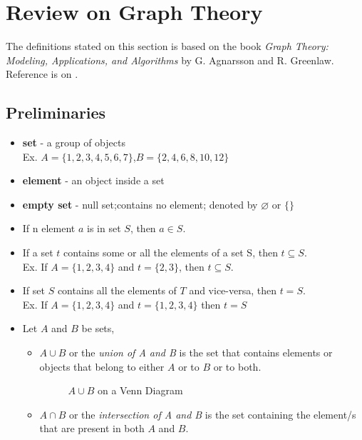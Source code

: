 \section{Review on Graph Theory  }
The definitions stated on this section is based on the book \textit{Graph Theory: Modeling, Applications, and Algorithms} by G. Agnarsson and R. Greenlaw. Reference is on \cite{agnarsson2006graph}.
\subsection{Preliminaries}
\begin{itemize}
\item \textbf{set} - a group of objects\\
Ex. $A=\{1,2,3,4,5,6,7\}$,$B=\{2,4,6,8,10,12\}$ 
\item \textbf{element} - an object inside a set
\item \textbf{empty set} - null set;contains no element; denoted by $\varnothing$ or $\{\}$
\item If n element $a$ is in set $S$, then $a \in S $.
\item If a set $t$ contains some or all the elements of a set S, then $t \subseteq S$.\\
Ex. If $A=\{1,2,3,4\}$ and $t=\{2,3\}$, then $t \subseteq S$.
\item If set $S$ contains all the elements of $T$ and vice-versa, then $t=S$.\\
Ex. If $A=\{1,2,3,4\}$ and $t=\{1,2,3,4\}$ then $t=S$
\item Let $A$ and $B$ be sets,
\begin{itemize}
	\item $A \cup B$ or the \textit{union of A and B} is the set that contains elements or objects that belong to either $A$ or to $B$ or to both.
	\begin{figure}[h]
	\centering
\caption{$A \cup B$ on a Venn Diagram}
	\end{figure}
	\item $A \cap B$ or the \textit{intersection of A and B} is the set containing the element/s that are present in both $A$ and $B$.
	\begin{figure}[h]
	\centering

\end{figure}
\end{itemize}
\end{itemize}
